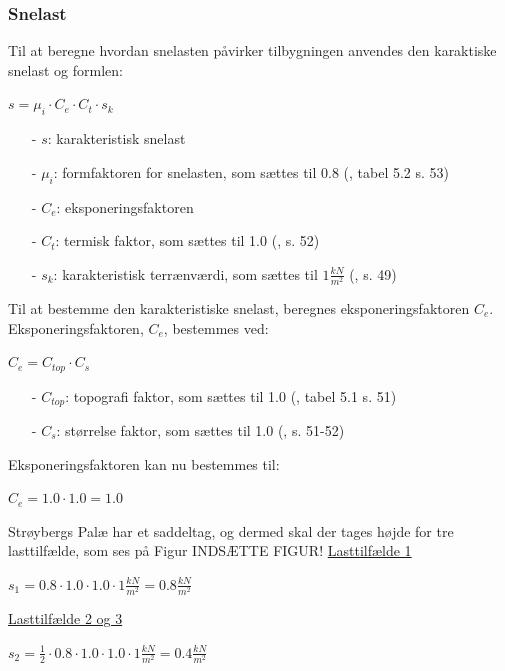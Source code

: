 \subsubsection{Snelast}
Til at beregne hvordan snelasten påvirker tilbygningen anvendes den karaktiske snelast og formlen:
\begin{center}
$s=\mu_i\cdot C_e\cdot C_t \cdot s_k$
\end{center}
\begin{itemize}
	\item[-] $s$: karakteristisk snelast
	\item[-] $\mu_i$: formfaktoren for snelasten, som sættes til 0.8 (\citep{EU91}, tabel 5.2 s. 53)
	\item[-] $C_e$: eksponeringsfaktoren
	\item[-] $C_t$: termisk faktor, som sættes til 1.0 (\citep{EU91}, s. 52)
	\item[-] $s_k$: karakteristisk terrænværdi, som sættes til $1 \frac{kN}{m^2}$ (\citep{EU91}, s. 49)
\end{itemize}
Til at bestemme den karakteristiske snelast, beregnes eksponeringsfaktoren $C_e$.
\newline
\newline
Eksponeringsfaktoren, $C_e$, bestemmes ved:
\begin{center}
$C_e=C_{top}\cdot C_s$
\end{center}
\begin{itemize}
	\item[-] $C_{top}$: topografi faktor, som sættes til 1.0 (\citep{EU91}, tabel 5.1 s. 51)
	\item[-] $C_s$: størrelse faktor, som sættes til 1.0 (\citep{EU91}, s. 51-52)
\end{itemize}
Eksponeringsfaktoren kan nu bestemmes til:
\begin{center}
$C_e=1.0\cdot 1.0=1.0$
\end{center}
Strøybergs Palæ har et saddeltag, og dermed skal der tages højde for tre lasttilfælde, som ses på Figur INDSÆTTE FIGUR!
\newline
\newline
\underline{Lasttilfælde 1}
\begin{center}
$s_1=0.8\cdot 1.0\cdot 1.0\cdot 1 \frac{kN}{m^2}=0.8 \frac{kN}{m^2}$
\end{center}
\underline{Lasttilfælde 2 og 3}
\begin{center}
$s_2=\frac{1}{2}\cdot 0.8\cdot 1.0\cdot 1.0\cdot 1 \frac{kN}{m^2}=0.4 \frac{kN}{m^2}$
\end{center}
